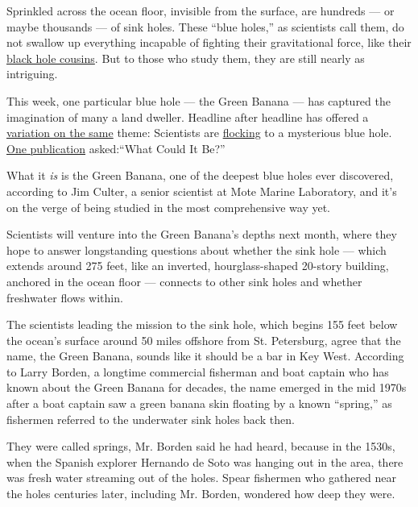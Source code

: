 Sprinkled across the ocean floor, invisible from the surface, are
hundreds --- or maybe thousands --- of sink holes. These ``blue holes,''
as scientists call them, do not swallow up everything incapable of
fighting their gravitational force, like their
\href{https://www.nytimes3xbfgragh.onion/2019/04/10/science/what-is-black-hole.html}{black
hole cousins}. But to those who study them, they are still nearly as
intriguing.

This week, one particular blue hole --- the Green Banana --- has
captured the imagination of many a land dweller. Headline after headline
has offered a
\href{https://www.google.com/search?client=firefox-b-1-d\&q=blue+hole}{variation
on the same} theme: Scientists are
\href{https://abcnews.go.com/US/scientists-investigate-blue-oceanic-mystery-off-florida-coast/story?id=71919756}{flocking}
to a mysterious blue hole.
\href{https://www.sciencetimes.com/articles/26577/20200723/fishermen-divers-mysterious-blue-hole-florida.htm}{One
publication} asked:``What Could It Be?''

What it \emph{is} is the Green Banana, one of the deepest blue holes
ever discovered, according to Jim Culter, a senior scientist at Mote
Marine Laboratory, and it's on the verge of being studied in the most
comprehensive way yet.

Scientists will venture into the Green Banana's depths next month, where
they hope to answer longstanding questions about whether the sink hole
--- which extends around 275 feet, like an inverted, hourglass-shaped
20-story building, anchored in the ocean floor --- connects to other
sink holes and whether freshwater flows within.

The scientists leading the mission to the sink hole, which begins 155
feet below the ocean's surface around 50 miles offshore from St.
Petersburg, agree that the name, the Green Banana, sounds like it should
be a bar in Key West. According to Larry Borden, a longtime commercial
fisherman and boat captain who has known about the Green Banana for
decades, the name emerged in the mid 1970s after a boat captain saw a
green banana skin floating by a known ``spring,'' as fishermen referred
to the underwater sink holes back then.

They were called springs, Mr. Borden said he had heard, because in the
1530s, when the Spanish explorer Hernando de Soto was hanging out in the
area, there was fresh water streaming out of the holes. Spear fishermen
who gathered near the holes centuries later, including Mr. Borden,
wondered how deep they were.

